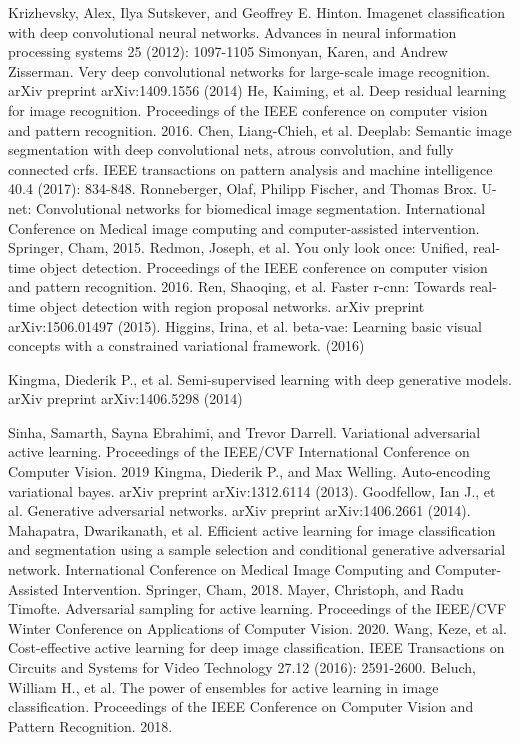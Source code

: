 \documentclass[runningheads]{llncs}
\begin{document}
\begin{thebibliography}{8}
    Krizhevsky, Alex, Ilya Sutskever, and Geoffrey E. Hinton. Imagenet classification with deep convolutional neural networks. Advances in neural information processing systems 25 (2012): 1097-1105
    Simonyan, Karen, and Andrew Zisserman. Very deep convolutional networks for large-scale image recognition. arXiv preprint arXiv:1409.1556 (2014)
    He, Kaiming, et al. Deep residual learning for image recognition. Proceedings of the IEEE conference on computer vision and pattern recognition. 2016.
    Chen, Liang-Chieh, et al. Deeplab: Semantic image segmentation with deep convolutional nets, atrous convolution, and fully connected crfs. IEEE transactions on pattern analysis and machine intelligence 40.4 (2017): 834-848.
    Ronneberger, Olaf, Philipp Fischer, and Thomas Brox. U-net: Convolutional networks for biomedical image segmentation. International Conference on Medical image computing and computer-assisted intervention. Springer, Cham, 2015.
    Redmon, Joseph, et al. You only look once: Unified, real-time object detection. Proceedings of the IEEE conference on computer vision and pattern recognition. 2016.
    Ren, Shaoqing, et al. Faster r-cnn: Towards real-time object detection with region proposal networks. arXiv preprint arXiv:1506.01497 (2015).
    Higgins, Irina, et al. beta-vae: Learning basic visual concepts with a constrained variational framework. (2016)

    Kingma, Diederik P., et al. Semi-supervised learning with deep generative models. arXiv preprint arXiv:1406.5298 (2014)

    Sinha, Samarth, Sayna Ebrahimi, and Trevor Darrell. Variational adversarial active learning. Proceedings of the IEEE/CVF International Conference on Computer Vision. 2019
    Kingma, Diederik P., and Max Welling. Auto-encoding variational bayes. arXiv preprint arXiv:1312.6114 (2013).
    Goodfellow, Ian J., et al. Generative adversarial networks. arXiv preprint arXiv:1406.2661 (2014).
    Mahapatra, Dwarikanath, et al. Efficient active learning for image classification and segmentation using a sample selection and conditional generative adversarial network. International Conference on Medical Image Computing and Computer-Assisted Intervention. Springer, Cham, 2018.
    Mayer, Christoph, and Radu Timofte. Adversarial sampling for active learning. Proceedings of the IEEE/CVF Winter Conference on Applications of Computer Vision. 2020.
    Wang, Keze, et al. Cost-effective active learning for deep image classification. IEEE Transactions on Circuits and Systems for Video Technology 27.12 (2016): 2591-2600.
    Beluch, William H., et al. The power of ensembles for active learning in image classification. Proceedings of the IEEE Conference on Computer Vision and Pattern Recognition. 2018.
\end{thebibliography}
\end{document}
